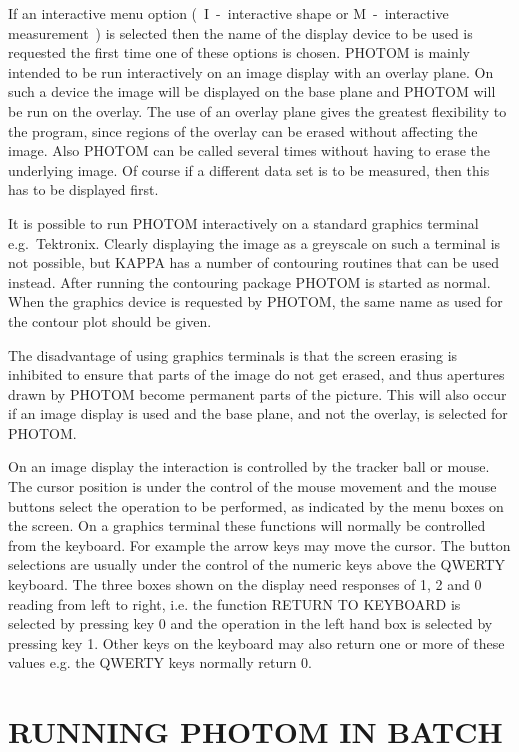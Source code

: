 If an interactive menu option (~I~-~interactive shape or M~-~interactive
measurement~) is selected then the name of the display device to be used
is requested the first time one of these options is chosen.
PHOTOM is mainly intended to be run interactively on an image display
with an overlay plane. On such a device the image will be displayed on
the base plane and PHOTOM will be run on the overlay. The use of an
overlay plane gives the greatest flexibility to the program, since
regions of the overlay can be erased without affecting the image.
Also PHOTOM can be called several times without having to erase the
underlying image. Of course if a different data set is to be measured,
then this has to be displayed first.

It is possible to run PHOTOM interactively on a standard graphics terminal
e.g.~Tektronix. Clearly displaying the image as a greyscale on such a
terminal is not possible, but KAPPA has a number of contouring routines
that can be used instead. After running the contouring package PHOTOM is
started as normal. When the graphics device is requested by PHOTOM, the
same name as used for the contour plot should be given.

The disadvantage of using graphics terminals is that the screen erasing
is inhibited to ensure that parts of the image do not get erased, and thus
apertures drawn by PHOTOM become permanent parts of the picture. This will
also occur if an image display is used and the base plane, and not the
overlay, is selected for PHOTOM.

On an image display the interaction is controlled by the tracker ball or
mouse. The cursor position is under the control of the mouse movement and
the mouse buttons select the operation to be performed, as indicated by
the menu boxes on the screen.
On a graphics terminal these functions will normally be controlled
from the keyboard. For example the arrow keys may move the cursor. The
button selections are usually under the control of the numeric keys above
the QWERTY keyboard. The three boxes shown on the display need responses
of 1, 2 and 0 reading from left to right, i.e. the function RETURN TO
KEYBOARD is selected by pressing key 0 and the operation in the left hand
box is selected by pressing key 1. Other keys on the keyboard may
also return one or more of these values e.g. the QWERTY keys normally
return 0.


\section{RUNNING PHOTOM IN BATCH}

